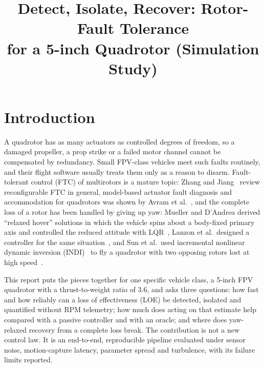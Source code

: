 \documentclass[conference]{IEEEtran}
\begin{document}
\title{Detect, Isolate, Recover: Rotor-Fault Tolerance\\for a 5-inch Quadrotor (Simulation Study)}
\author{
}
\maketitle

\begin{abstract}

\end{abstract}

\section{Introduction}
A quadrotor has as many actuators as controlled degrees of freedom, so a damaged
propeller, a prop strike or a failed motor channel cannot be compensated by redundancy.
Small FPV-class vehicles meet such faults routinely, and their flight software usually
treats them only as a reason to disarm. Fault-tolerant control (FTC) of multirotors is a
mature topic: Zhang and Jiang~\cite{zhang2008bibliographical} review reconfigurable FTC in
general, model-based actuator fault diagnosis and accommodation for quadrotors was shown by
Avram et al.~\cite{avram2017quadrotor}, and the complete loss of a rotor has been handled by
giving up yaw: Mueller and D'Andrea derived ``relaxed hover'' solutions in which the vehicle
spins about a body-fixed primary axis and controlled the reduced attitude with
LQR~\cite{mueller2014stability,mueller2016relaxed}, Lanzon et al.\ designed a controller for
the same situation~\cite{lanzon2014flight}, and Sun et al.\ used incremental nonlinear dynamic
inversion (INDI)~\cite{smeur2016adaptive} to fly a quadrotor with two opposing rotors lost at
high speed~\cite{sun2021incremental}.

This report puts the pieces together for one specific vehicle class, a 5-inch FPV quadrotor
with a thrust-to-weight ratio of 3.6, and asks three questions: how fast and how reliably can a
loss of effectiveness (LOE) be detected, isolated and quantified without RPM telemetry; how
much does acting on that estimate help compared with a passive controller and with an oracle;
and where does yaw-relaxed recovery from a complete loss break. The contribution is not a new
control law. It is an end-to-end, reproducible pipeline evaluated under sensor noise,
motion-capture latency, parameter spread and turbulence, with its failure limits reported.
\end{document}

